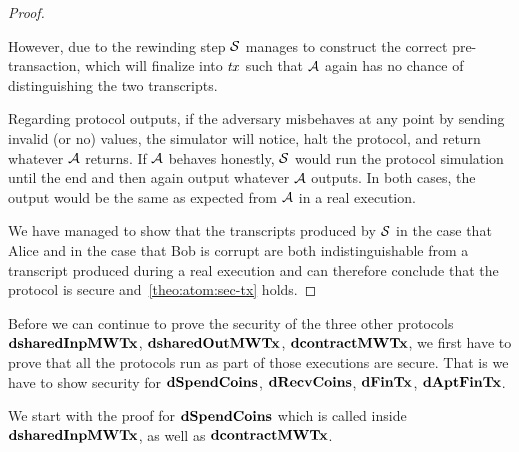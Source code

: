 \begin{proof}
\begin{asparaitem}
        However, due to the rewinding step $\mathcal{S}$ manages to construct the correct pre-transaction, which will finalize into $\mathit{tx}$ such that $\mathcal{A}$ again has no chance of distinguishing the two transcripts.
        \item Regarding protocol outputs, if the adversary misbehaves at any point by sending invalid (or no) values, the simulator will notice, halt the protocol, and return whatever $\mathcal{A}$ returns.
        If $\mathcal{A}$ behaves honestly, $\mathcal{S}$ would run the protocol simulation until the end and then again output whatever $\mathcal{A}$ outputs.
        In both cases, the output would be the same as expected from $\mathcal{A}$ in a real execution.
    \end{asparaitem}

    We have managed to show that the transcripts produced by $\mathcal{S}$ in the case that Alice and in the case that Bob is corrupt are both indistinguishable from a transcript produced during a real execution and can therefore conclude that the protocol is secure and~\cref{theo:atom:sec-tx} holds.

\end{proof}

Before we can continue to prove the security of the three other protocols \\$\mathbf{dsharedInpMWTx}$, $\mathbf{dsharedOutMWTx}$, $\mathbf{dcontractMWTx}$, we first have to prove that all the protocols run as part of those executions are secure.
That is we have to show security for $\mathbf{dSpendCoins}$, $\mathbf{dRecvCoins}$, $\mathbf{dFinTx}$, $\mathbf{dAptFinTx}$.

We start with the proof for $\mathbf{dSpendCoins}$ which is called inside $\mathbf{dsharedInpMWTx}$,
as well as $\mathbf{dcontractMWTx}$.

